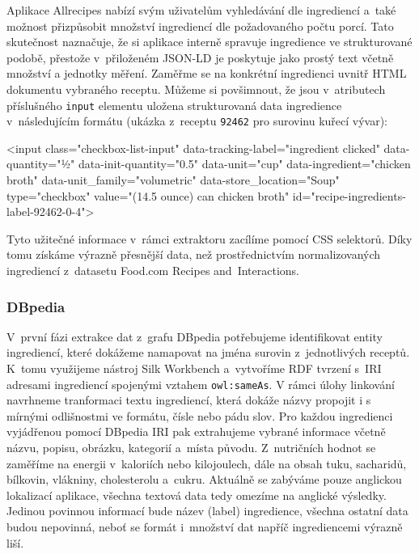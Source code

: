 Aplikace Allrecipes nabízí svým uživatelům vyhledávání dle ingrediencí a~také možnost přizpůsobit množství ingrediencí dle požadovaného počtu porcí. Tato skutečnost naznačuje, že si aplikace interně spravuje ingredience ve strukturované podobě, přestože v~přiloženém JSON-LD je poskytuje jako prostý text včetně množství a jednotky měření. Zaměřme se na konkrétní ingredienci uvnitř HTML dokumentu vybraného receptu. Můžeme si povšimnout, že jsou v~atributech příslušného \texttt{input} elementu uložena strukturovaná data ingredience v~následujícím formátu (ukázka z~receptu \texttt{92462} pro surovinu kuřecí vývar):

\begin{code}
<input
    class="checkbox-list-input"
    data-tracking-label="ingredient clicked"
    data-quantity="½"
    data-init-quantity="0.5"
    data-unit="cup"
    data-ingredient="chicken broth"
    data-unit_family="volumetric"
    data-store_location="Soup"
    type="checkbox"
    value="(14.5 ounce) can chicken broth"
    id="recipe-ingredients-label-92462-0-4">
\end{code}

Tyto užitečné informace v~rámci extraktoru zacílíme pomocí CSS selektorů. Díky tomu získáme výrazně přesnější data, než prostřednictvím normalizovaných ingrediencí z~datasetu Food.com Recipes and~Interactions.

\subsubsection{DBpedia}

V~první fázi extrakce dat z~grafu DBpedia potřebujeme identifikovat entity ingrediencí, které dokážeme namapovat na jména surovin z~jednotlivých receptů. K~tomu využijeme nástroj Silk Workbench a~vytvoříme RDF tvrzení s~IRI adresami ingrediencí spojenými vztahem \texttt{owl:sameAs}. V rámci úlohy linkování navrhneme tranformaci textu ingrediencí, která dokáže názvy propojit i s mírnými odlišnostmi ve formátu, čísle nebo pádu slov. Pro každou ingredienci vyjádřenou pomocí DBpedia IRI pak extrahujeme vybrané informace včetně názvu, popisu, obrázku, kategorií a~místa původu. Z~nutričních hodnot se zaměříme na energii v~kaloriích nebo kilojoulech, dále na obsah tuku, sacharidů, bílkovin, vlákniny, cholesterolu a~cukru. Aktuálně se zabýváme pouze anglickou lokalizací aplikace, všechna textová data tedy omezíme na anglické výsledky. Jedinou povinnou informací bude název (label) ingredience, všechna ostatní data budou nepovinná, neboť se formát i~množství dat napříč ingrediencemi výrazně liší.

